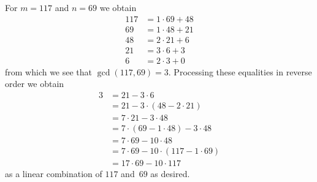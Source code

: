 \documentclass{jn-pset}
\begin{document}
\begin{problem}
\begin{solution}
  For
  $m = 117$
  and
  $n = 69$
  we obtain
  \begin{align*}   
    117 &= 1 \cdot 69 + 48 \\
    69  &= 1 \cdot 48 + 21 \\
    48  &= 2 \cdot 21 +  6 \\
    21  &= 3 \cdot 6 +  3 \\   
    6  &= 2 \cdot  3 +  0
  \end{align*}
  from which we see that 
  $
  \gcd (117, 69) = 3
  $.
  Processing these equalities in reverse order we obtain
  \begin{align*}
     3 &= 
         21 - 3 \cdot  6          
    \\
       &=
         21 - 3 \cdot ( 48 - 2 \cdot 21 )
    \\
       &=
         7 \cdot 21 - 3 \cdot  48    
    \\
       &=
         7 \cdot ( 69 - 1 \cdot 48 )
         - 3 \cdot  48
    \\
       &=
         7 \cdot  69 - 10 \cdot  48
    \\   
       &=
         7 \cdot  69 - 10 \cdot (117 - 1 \cdot 69 )         
    \\   
       &=
         17 \cdot  69 - 10 \cdot 117 
  \end{align*}
  as a linear combination of
  $117$ and~$69$ as desired.
\end{solution}


\end{problem}





\end{document}
